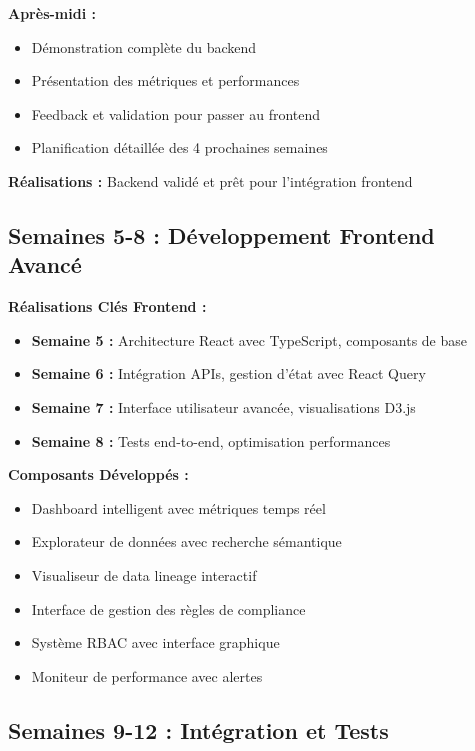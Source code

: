 \documentclass[a4paper,12pt]{article}
\begin{document}
\textbf{Après-midi :}
\begin{itemize}
    \item Démonstration complète du backend
    \item Présentation des métriques et performances
    \item Feedback et validation pour passer au frontend
    \item Planification détaillée des 4 prochaines semaines
\end{itemize}

\textbf{Réalisations :} Backend validé et prêt pour l'intégration frontend

\subsection*{Semaines 5-8 : Développement Frontend Avancé}

\textbf{Réalisations Clés Frontend :}

\begin{itemize}
    \item \textbf{Semaine 5 :} Architecture React avec TypeScript, composants de base
    \item \textbf{Semaine 6 :} Intégration APIs, gestion d'état avec React Query
    \item \textbf{Semaine 7 :} Interface utilisateur avancée, visualisations D3.js
    \item \textbf{Semaine 8 :} Tests end-to-end, optimisation performances
\end{itemize}

\textbf{Composants Développés :}
\begin{itemize}
    \item Dashboard intelligent avec métriques temps réel
    \item Explorateur de données avec recherche sémantique
    \item Visualiseur de data lineage interactif
    \item Interface de gestion des règles de compliance
    \item Système RBAC avec interface graphique
    \item Moniteur de performance avec alertes
\end{itemize}

\subsection*{Semaines 9-12 : Intégration et Tests}
\end{document}
